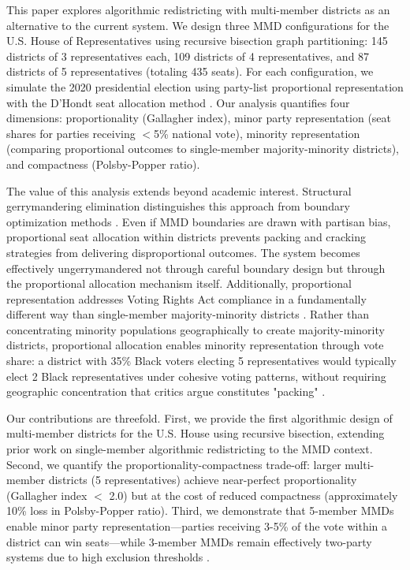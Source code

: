 This paper explores algorithmic redistricting with multi-member districts as an alternative to the current system. We design three MMD configurations for the U.S. House of Representatives using recursive bisection graph partitioning: 145 districts of 3 representatives each, 109 districts of 4 representatives, and 87 districts of 5 representatives (totaling 435 seats). For each configuration, we simulate the 2020 presidential election using party-list proportional representation with the D'Hondt seat allocation method \citep{gallagher2014election}. Our analysis quantifies four dimensions: proportionality (Gallagher index), minor party representation (seat shares for parties receiving $<$5\% national vote), minority representation (comparing proportional outcomes to single-member majority-minority districts), and compactness (Polsby-Popper ratio).

The value of this analysis extends beyond academic interest. Structural gerrymandering elimination distinguishes this approach from boundary optimization methods \citep{altman2011bqap, DeFord2021}. Even if MMD boundaries are drawn with partisan bias, proportional seat allocation within districts prevents packing and cracking strategies from delivering disproportional outcomes. The system becomes effectively ungerrymandered not through careful boundary design but through the proportional allocation mechanism itself. Additionally, proportional representation addresses Voting Rights Act compliance in a fundamentally different way than single-member majority-minority districts \citep{guinier1994tyranny}. Rather than concentrating minority populations geographically to create majority-minority districts, proportional allocation enables minority representation through vote share: a district with 35\% Black voters electing 5 representatives would typically elect 2 Black representatives under cohesive voting patterns, without requiring geographic concentration that critics argue constitutes "packing" \citep{rush2000redistricting}.

Our contributions are threefold. First, we provide the first algorithmic design of multi-member districts for the U.S. House using recursive bisection, extending prior work on single-member algorithmic redistricting \citep{cirincione2000measuring, cho2017measuring} to the MMD context. Second, we quantify the proportionality-compactness trade-off: larger multi-member districts (5 representatives) achieve near-perfect proportionality (Gallagher index $<$ 2.0) but at the cost of reduced compactness (approximately 10\% loss in Polsby-Popper ratio). Third, we demonstrate that 5-member MMDs enable minor party representation—parties receiving 3-5\% of the vote within a district can win seats—while 3-member MMDs remain effectively two-party systems due to high exclusion thresholds \citep{taagepera2007seats}.
